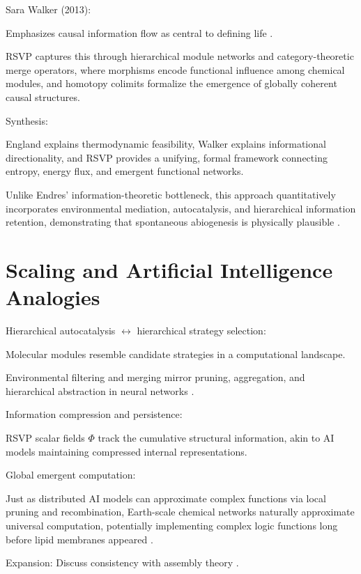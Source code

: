 \documentclass[openany]{book}
\begin{document}
Sara Walker (2013):

Emphasizes causal information flow as central to defining life \citep{walker2013}.

RSVP captures this through hierarchical module networks and category-theoretic merge operators, where morphisms encode functional influence among chemical modules, and homotopy colimits formalize the emergence of globally coherent causal structures.

Synthesis:

England explains thermodynamic feasibility, Walker explains informational directionality, and RSVP provides a unifying, formal framework connecting entropy, energy flux, and emergent functional networks.

Unlike Endres’ information-theoretic bottleneck, this approach quantitatively incorporates environmental mediation, autocatalysis, and hierarchical information retention, demonstrating that spontaneous abiogenesis is physically plausible \citep{hordijk2013}.

\section{Scaling and Artificial Intelligence Analogies}
Hierarchical autocatalysis $\leftrightarrow$ hierarchical strategy selection:

Molecular modules resemble candidate strategies in a computational landscape.

Environmental filtering and merging mirror pruning, aggregation, and hierarchical abstraction in neural networks \citep{scalinghypothesis}.

Information compression and persistence:

RSVP scalar fields $\Phi$ track the cumulative structural information, akin to AI models maintaining compressed internal representations.

Global emergent computation:

Just as distributed AI models can approximate complex functions via local pruning and recombination, Earth-scale chemical networks naturally approximate universal computation, potentially implementing complex logic functions long before lipid membranes appeared \citep{day2024}.

Expansion: Discuss consistency with assembly theory \citep{sharma2023}.
\end{document}
